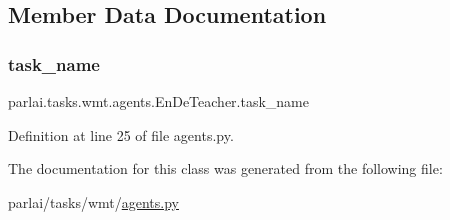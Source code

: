 \subsection{Member Data Documentation}
\mbox{\label{classparlai_1_1tasks_1_1wmt_1_1agents_1_1EnDeTeacher_a694d05cdfc00638200d219f8bfc9b595}} 
\subsubsection{\texorpdfstring{task\+\_\+name}{task\_name}}
{\footnotesize\ttfamily parlai.\+tasks.\+wmt.\+agents.\+En\+De\+Teacher.\+task\+\_\+name}



Definition at line 25 of file agents.\+py.



The documentation for this class was generated from the following file\+:\begin{DoxyCompactItemize}
\item 
parlai/tasks/wmt/\hyperlink{parlai_2tasks_2wmt_2agents_8py}{agents.\+py}\end{DoxyCompactItemize}
